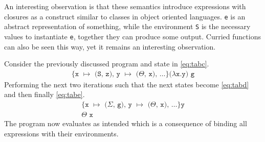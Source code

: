 \documentclass[11pt,oneside,a4paper]{report}
\begin{document}
\begin{remark}
  An interesting observation is that these semantics introduce expressions with closures as a construct similar to classes in object oriented languages.
  \texttt{e} is an abstract representation of something, while the environment \texttt{S} is the necessary values to instantiate \texttt{e}, together they can produce some output.
  Curried functions can also be seen this way, yet it remains an interesting observation.
\end{remark}

\noindent Consider the previously discussed program and state in \autoref{eq:tabc}.
\begin{align}
  \texttt{\{x $\mapsto$ (S, z), y $\mapsto$ ($\Theta$, x), $\dots$\}($\lambda$x.y) g} \label{eq:tabc}
\end{align}
Performing the next two iterations such that the next states become \autoref{eq:tabd} and then finally \autoref{eq:tabe}.
\begin{gather}
  \texttt{\{x $\mapsto$ ($\Sigma$, g), y $\mapsto$ ($\Theta$, x), $\dots$\}y} \label{eq:tabd}\\
  \texttt{$\Theta$ x} \label{eq:tabe}
\end{gather}
The program now evaluates as intended which is a consequence of binding all expressions with their environments.

\end{document}
